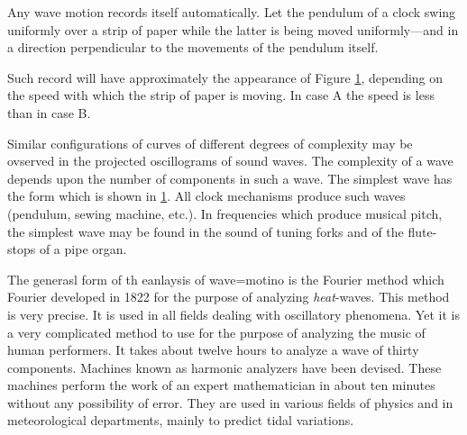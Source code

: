 Any wave motion records itself automatically. Let the pendulum of a clock swing uniformly over a strip of paper while the latter is being moved uniformly---and in a direction perpendicular to the movements of the pendulum itself.

Such record will have approximately the appearance of Figure \ref{twowaves}, depending on the speed with which the strip of paper is moving. In case A the speed is less than in case B.

\begin{figure}[tbp]
	\caption{}
	\label{twowaves}
\end{figure}

Similar configurations of curves of different degrees of complexity may be ovserved in the projected oscillograms of sound waves. The complexity of a wave depends upon the number of components in such a wave. The simplest wave has the form which is shown in \ref{twowaves}. All clock mechanisms produce such waves (pendulum, sewing machine, etc.). In frequencies which produce musical pitch, the simplest wave may be found in the sound of tuning forks and of the flute-stops of a pipe organ.

The generasl form of th eanlaysis of wave=motino is the Fourier method which Fourier developed in 1822 for the purpose of analyzing \textit{heat}-waves. This method is very precise. It is used in all fields dealing with oscillatory phenomena. Yet it is a very complicated method to use for the purpose of analyzing the music of human performers. It takes about twelve hours to analyze a wave of thirty components. Machines known as harmonic analyzers have been devised. These machines perform the work of an expert mathematician in about ten minutes without any possibility of error. They are used in various fields of physics and in meteorological departments, mainly to predict tidal variations.

